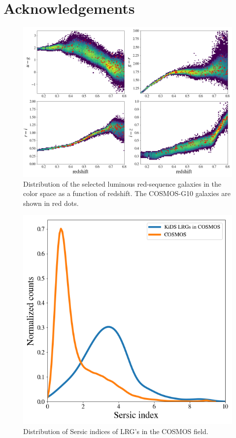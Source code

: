 \documentclass[fleqn,usenatbib,useAMS]{mnras}
\begin{document}
\section*{Acknowledgements}


\begin{figure}
\includegraphics[width=\textwidth]{figures_tmp/cosmos_color.png}
\caption{\label{fig:cosmos_color}Distribution of the selected luminous red-sequence galaxies in 
the color space as a function of redshift. The COSMOS-G10 galaxies are shown in red dots.} 
\end{figure}

\begin{figure}
\includegraphics[width=\columnwidth]{figures_tmp/cosmos_sersic.png}
\caption{\label{fig:cosmos_sersic}Distribution of Sersic indices of LRG's in the COSMOS field.} 
\end{figure}
\end{document}
